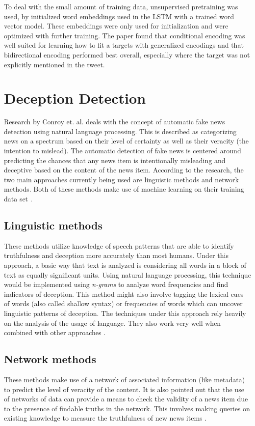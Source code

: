 \documentclass[11pt,a4paper]{article}
\begin{document}
To deal with the small amount of training data, unsupervised pretraining was used, by initialized word embeddings used in the LSTM with a trained word vector model. These embeddings were only used for initialization and were optimized with further training. The paper found that conditional encoding was well suited for learning how to fit a targets with generalized encodings and that bidirectional encoding performed best overall, especially where the target was not explicitly mentioned in the tweet. \\
\section{Deception Detection} 

Research by Conroy et. al. deals with the concept of automatic fake news detection using natural language processing. This is described as categorizing news on a spectrum based on their level of certainty as well as their veracity (the intention to mislead). The automatic detection of fake news is centered around predicting the chances that any news item is intentionally misleading and deceptive based on the content of the news item. According to the research, the two main approaches currently being used are linguistic methods and network methods. Both of these methods make use of machine learning on their training data set \cite{conroy2015automatic}. \\

\subsection{Linguistic methods}
These methods utilize knowledge of speech patterns that are able to identify truthfulness and deception more accurately than most humans. Under this approach, a basic way that text is analyzed is considering all words in a block of text as equally significant units. Using natural language processing, this technique would be implemented using \textit{n-grams} to analyze word frequencies and find indicators of deception. This method might also involve tagging the lexical cues of words (also called shallow syntax) or frequencies of words which can uncover linguistic patterns of deception. The techniques under this approach rely heavily on the analysis of the usage of language. They also work very well when combined with other approaches \cite{conroy2015automatic}. \\

\subsection{Network methods}
These methods make use of a network of associated information (like metadata) to predict the level of veracity of the content. It is also pointed out that the use of networks of data can provide a means to check the validity of a news item due to the presence of findable truths in the network. This involves making queries on existing knowledge to measure the truthfulness of new news items \cite{conroy2015automatic}. \\
\end{document}

